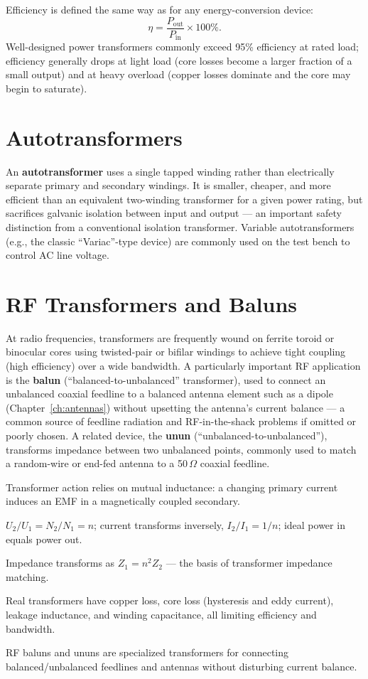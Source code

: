 Efficiency is defined the same way as for any energy-conversion device:
\[
\eta = \frac{P_{\text{out}}}{P_{\text{in}}} \times 100\%.
\]
Well-designed power transformers commonly exceed 95\% efficiency at
rated load; efficiency generally drops at light load (core losses become
a larger fraction of a small output) and at heavy overload (copper
losses dominate and the core may begin to saturate).

\section{Autotransformers}

An \textbf{autotransformer} uses a single tapped winding rather than
electrically separate primary and secondary windings. It is smaller,
cheaper, and more efficient than an equivalent two-winding transformer
for a given power rating, but sacrifices galvanic isolation between
input and output --- an important safety distinction from a conventional
isolation transformer. Variable autotransformers (e.g., the classic
``Variac''-type device) are commonly used on the test bench to control AC
line voltage.

\section{RF Transformers and Baluns}

At radio frequencies, transformers are frequently wound on ferrite
toroid or binocular cores using twisted-pair or bifilar windings to
achieve tight coupling (high efficiency) over a wide bandwidth. A
particularly important RF application is the \textbf{balun}
(``balanced-to-unbalanced'' transformer), used to connect an unbalanced
coaxial feedline to a balanced antenna element such as a dipole
(Chapter~\ref{ch:antennas}) without upsetting the antenna's current
balance --- a common source of feedline radiation and RF-in-the-shack
problems if omitted or poorly chosen. A related device, the \textbf{unun}
(``unbalanced-to-unbalanced''), transforms impedance between two
unbalanced points, commonly used to match a random-wire or end-fed
antenna to a 50\,$\Omega$ coaxial feedline.

\begin{quickreview}
\item Transformer action relies on mutual inductance: a changing primary
current induces an EMF in a magnetically coupled secondary.
\item $U_2/U_1 = N_2/N_1 = n$; current transforms inversely, $I_2/I_1 =
1/n$; ideal power in equals power out.
\item Impedance transforms as $Z_1 = n^2 Z_2$ --- the basis of
transformer impedance matching.
\item Real transformers have copper loss, core loss (hysteresis and eddy
current), leakage inductance, and winding capacitance, all limiting
efficiency and bandwidth.
\item RF baluns and ununs are specialized transformers for connecting
balanced/unbalanced feedlines and antennas without disturbing current
balance.
\end{quickreview}

